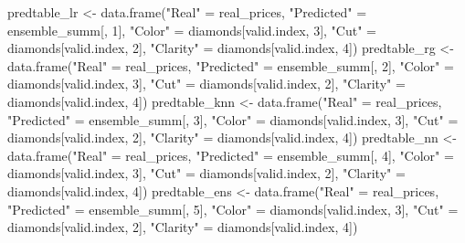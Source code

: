 \documentclass[
]{article}
\newenvironment{Shaded}{\begin{snugshade}}{\end{snugshade}}
\newcommand{\DecValTok}[1]{\textcolor[rgb]{0.00,0.00,0.81}{#1}}
\newcommand{\FunctionTok}[1]{\textcolor[rgb]{0.00,0.00,0.00}{#1}}
\newcommand{\NormalTok}[1]{#1}
\newcommand{\OtherTok}[1]{\textcolor[rgb]{0.56,0.35,0.01}{#1}}
\newcommand{\StringTok}[1]{\textcolor[rgb]{0.31,0.60,0.02}{#1}}
\begin{document}
\begin{Shaded}
\begin{Highlighting}[]
\NormalTok{predtable\_lr }\OtherTok{\textless{}{-}} \FunctionTok{data.frame}\NormalTok{(}\StringTok{"Real"} \OtherTok{=}\NormalTok{ real\_prices, }
                    \StringTok{"Predicted"} \OtherTok{=}\NormalTok{ ensemble\_summ[, }\DecValTok{1}\NormalTok{],}
                    \StringTok{"Color"} \OtherTok{=}\NormalTok{ diamonds[valid.index, }\DecValTok{3}\NormalTok{],}
                    \StringTok{"Cut"} \OtherTok{=}\NormalTok{ diamonds[valid.index, }\DecValTok{2}\NormalTok{],}
                    \StringTok{"Clarity"} \OtherTok{=}\NormalTok{ diamonds[valid.index, }\DecValTok{4}\NormalTok{])}
\NormalTok{predtable\_rg }\OtherTok{\textless{}{-}} \FunctionTok{data.frame}\NormalTok{(}\StringTok{"Real"} \OtherTok{=}\NormalTok{ real\_prices, }
                    \StringTok{"Predicted"} \OtherTok{=}\NormalTok{ ensemble\_summ[, }\DecValTok{2}\NormalTok{], }
                    \StringTok{"Color"} \OtherTok{=}\NormalTok{ diamonds[valid.index, }\DecValTok{3}\NormalTok{],}
                    \StringTok{"Cut"} \OtherTok{=}\NormalTok{ diamonds[valid.index, }\DecValTok{2}\NormalTok{],}
                    \StringTok{"Clarity"} \OtherTok{=}\NormalTok{ diamonds[valid.index, }\DecValTok{4}\NormalTok{])}
\NormalTok{predtable\_knn }\OtherTok{\textless{}{-}} \FunctionTok{data.frame}\NormalTok{(}\StringTok{"Real"} \OtherTok{=}\NormalTok{ real\_prices, }
                    \StringTok{"Predicted"} \OtherTok{=}\NormalTok{ ensemble\_summ[, }\DecValTok{3}\NormalTok{], }
                    \StringTok{"Color"} \OtherTok{=}\NormalTok{ diamonds[valid.index, }\DecValTok{3}\NormalTok{],}
                    \StringTok{"Cut"} \OtherTok{=}\NormalTok{ diamonds[valid.index, }\DecValTok{2}\NormalTok{],}
                    \StringTok{"Clarity"} \OtherTok{=}\NormalTok{ diamonds[valid.index, }\DecValTok{4}\NormalTok{])}
\NormalTok{predtable\_nn }\OtherTok{\textless{}{-}} \FunctionTok{data.frame}\NormalTok{(}\StringTok{"Real"} \OtherTok{=}\NormalTok{ real\_prices, }
                    \StringTok{"Predicted"} \OtherTok{=}\NormalTok{ ensemble\_summ[, }\DecValTok{4}\NormalTok{], }
                    \StringTok{"Color"} \OtherTok{=}\NormalTok{ diamonds[valid.index, }\DecValTok{3}\NormalTok{],}
                    \StringTok{"Cut"} \OtherTok{=}\NormalTok{ diamonds[valid.index, }\DecValTok{2}\NormalTok{],}
                    \StringTok{"Clarity"} \OtherTok{=}\NormalTok{ diamonds[valid.index, }\DecValTok{4}\NormalTok{])}
\NormalTok{predtable\_ens }\OtherTok{\textless{}{-}} \FunctionTok{data.frame}\NormalTok{(}\StringTok{"Real"} \OtherTok{=}\NormalTok{ real\_prices, }
                    \StringTok{"Predicted"} \OtherTok{=}\NormalTok{ ensemble\_summ[, }\DecValTok{5}\NormalTok{], }
                    \StringTok{"Color"} \OtherTok{=}\NormalTok{ diamonds[valid.index, }\DecValTok{3}\NormalTok{],}
                    \StringTok{"Cut"} \OtherTok{=}\NormalTok{ diamonds[valid.index, }\DecValTok{2}\NormalTok{],}
                    \StringTok{"Clarity"} \OtherTok{=}\NormalTok{ diamonds[valid.index, }\DecValTok{4}\NormalTok{])}



\end{Highlighting}
\end{Shaded}
\end{document}
